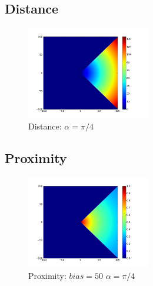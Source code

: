 \documentclass[a4paper]{article}
\begin{document}
\subsection{Distance}
\begin{figure}
	\vspace{-30pt}
	\begin{center}
		\includegraphics[width=0.48\textwidth]{graphs/distance.png}
	\end{center}
	\vspace{-30pt}
	\caption{Distance: $\alpha=\pi/4$}
\end{figure}

\subsection{Proximity}
\begin{figure}
	\vspace{-30pt}
	\begin{center}
		\includegraphics[width=0.48\textwidth]{graphs/proximity.png}
	\end{center}
	\vspace{-30pt}
	\caption{Proximity: $bias=50$ $\alpha=\pi/4$}
\end{figure}
\end{document}
